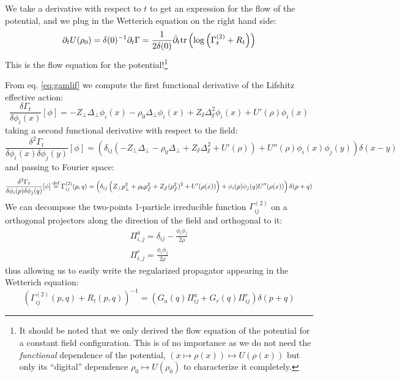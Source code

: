 We take a derivative with respect to $t$ to get an expression for the flow of the potential, and we plug in the Wetterich equation on the right hand side:
\begin{equation}
 \partial_t U(\rho_0) = \delta(0)^{-1} \partial_t \Gamma = \frac{1}{2 \delta(0)} \hat \partial_t  \text{tr}\left(\log\left( \Gamma_t^{(2)} + R_t  \right)\right) 
\end{equation}
This is the flow equation for the potential!\footnote{It should be noted that we only derived the flow equation of the potential for a constant field configuration. This is of no importance as we do not need the \textit{functional} dependence of the potential, $(x \mapsto \rho(x)) \mapsto U(\rho(x))$ but only its ``digital'' dependence $\rho_0 \mapsto U(\rho_0)$ to characterize it completely.}

From eq. \ref{eq:gamlif} we compute the first functional derivative of the Lifshitz effective action:
\begin{equation}
\frac{\delta \Gamma_t}{\delta \phi_i(x)}[\phi] = - Z_\perp \Delta_\perp \phi_i(x) - \rho_0 \Delta_\perp \phi_i(x) + Z_\sslash \Delta_\sslash^2 \phi_i(x) + U'(\rho) \phi_i(x)
\end{equation}
taking a second functional derivative with respect to the field:
\begin{equation}
\frac{\delta^2 \Gamma_t}{\delta \phi_i(x) \delta \phi_j(y)}[\phi] =\left(   \delta_{ij} \left( - Z_\perp \Delta_\perp - \rho_0 \Delta_\perp + Z_\sslash \Delta_\sslash^2  + U'(\rho) \right) + U''(\rho) \phi_i(x) \phi_j(y) \right) \delta(x-y)
\end{equation}
and passing to Fourier space:
\begin{equation}
\frac{\delta^2 \Gamma_t}{\delta \phi_i(p) \delta \phi_j(q)}[\phi]  \overset{\text{def}}{=}  \Gamma^{(2)}_{ij}(p,q) = 
\left( \delta_{ij} \left(Z_\perp p_{\perp}^2 +\rho_0 p_{\sslash}^2 +Z_\sslash (p_\sslash^2)^2 + U'(\rho (x))\right)+\phi_i(p) \phi_j(q) U''(\rho (x)) \right) \delta(p+q)
\end{equation}
We can decompose the two-points 1-particle irreducible function $\Gamma^{(2)}_{ij}$ on a orthogonal projectors along the direction of the field and orthogonal to it:
\begin{align}
\Pi^a_{i,j} = \delta_{ij} - \frac{\phi_i \phi_j}{2 \rho} \\
\Pi^r_{i,j} = \frac{\phi_i \phi_j}{2 \rho}
\end{align}
thus allowing us to easily write the regularized propagator appearing in the Wetterich equation:
\begin{equation}
\left( \Gamma^{(2)}_{ij}(p,q) + R_t(p,q) \right)^{-1} = \left( G_a(q) \Pi^a_{ij} + G_r(q) \Pi^r_{ij} \right) \delta(p+q)
\end{equation}
